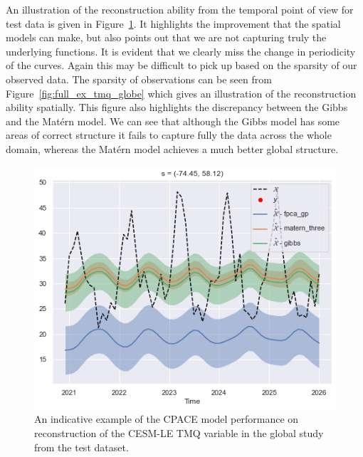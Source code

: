 An illustration of the reconstruction ability from the temporal point of view for test data is given in Figure~\ref{fig:test_ex_tmq_globe}.
It highlights the improvement that the spatial models can make, but also points out that we are not capturing truly the underlying functions.
It is evident that we clearly miss the change in periodicity of the curves.
Again this may be difficult to pick up based on the sparsity of our observed data.
The sparsity of observations can be seen from Figure~\ref{fig:full_ex_tmq_globe} which gives an illustration of the reconstruction ability spatially.
This figure also highlights the discrepancy between the Gibbs and the Mat\'ern model.
We can see that although the Gibbs model has some areas of correct structure it fails to capture fully the data across the whole domain, whereas the Mat\'ern model achieves a much better global structure.

\begin{figure}
	\centering
	\includegraphics[width=\textwidth]{test_ex_tmq_globe}
	\caption{An indicative example of the CPACE model performance on reconstruction of the CESM-LE TMQ variable in the global study from the test dataset.}
	\label{fig:test_ex_tmq_globe}
\end{figure}

